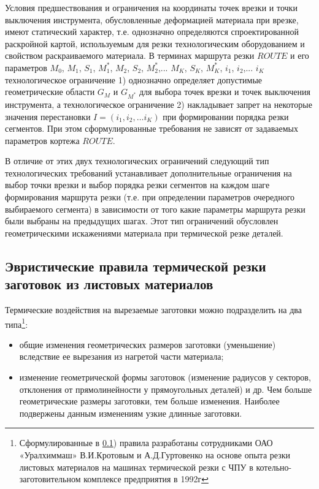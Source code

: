 \documentclass[12pt,twoside]{report}
\begin{document}
Условия предшествования и ограничения на координаты точек врезки
и точки выключения инструмента,
обусловленные деформацией материала при врезке,
имеют статический характер,
т.е. однозначно определяются спроектированной раскройной картой,
используемым для резки технологическим оборудованием
и свойством раскраиваемого материала.
В терминах маршрута резки $ROUTE$
и его параметров
$M_0$, $M_1$, $S_1$, $M_1^*$, $M_2$, $S_2$, $M_2^*$,... $M_K$, $S_K$, $M_K^*$,
$i_1$, $i_2$,... $i_K$
технологическое ограничение
1) однозначно определяет допустимые геометрические области
$G_M$
и
$G_{M^*}$
для выбора точек врезки и точек выключения инструмента,
а технологическое ограничение
2) накладывает запрет на некоторые значения перестановки
$ I = (i_1, i_2, \dots i_K)$
при формировании порядка резки сегментов. При
этом сформулированные требования не зависят от задаваемых параметров кортежа
$ROUTE$.

В отличие от этих двух технологических ограничений
следующий тип технологических требований устанавливает
дополнительные ограничения на выбор точки врезки и выбор
порядка резки сегментов на каждом шаге формирования маршрута резки
(т.е. при определении параметров очередного выбираемого сегмента)
в зависимости от того какие параметры маршрута резки были выбраны на предыдущих шагах.
Этот тип ограничений обусловлен геометрическими
искажениями материала при термической резке деталей.

\subsection{Эвристические правила термической резки заготовок из листовых материалов}
\label{Par133}

Термические воздействия на вырезаемые заготовки можно подразделить на два типа\footnote{
  Сформулированные в \ref{Par133})
  правила разработаны сотрудниками ОАО «Уралхиммаш»
  В.И.Кротовым и А.Д.Гуртовенко на основе опыта
  резки листовых материалов на машинах термической резки с ЧПУ
  в котельно-заготовительном комплексе предприятия в 1992г
}:

\begin{itemize}
\item общие изменения геометрических размеров заготовки (уменьшение)
вследствие ее вырезания из нагретой части материала;
\item	изменение геометрической формы заготовок
(изменение радиусов у секторов,
отклонения от прямолинейности у прямоугольных деталей) и др.
Чем больше геометрические размеры заготовки,
тем больше изменения.
Наиболее  подвержены данным изменениям узкие длинные заготовки.
\end{itemize}
\end{document}
